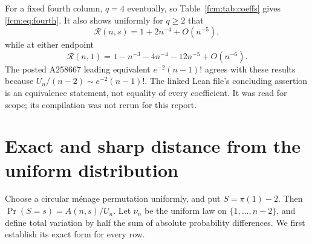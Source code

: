 \documentclass[11pt,letterpaper]{article}
\theoremstyle{remark}\newtheorem{remark}[theorem]{Remark}
\newcommand{\RR}{\mathcal R}
\begin{document}
For a fixed fourth column, $q=4$ eventually, so Table~\ref{fcm:tab:coeffs} gives \eqref{fcm:eq:fourth}. It also shows uniformly for $q\ge2$ that
\begin{equation}\label{fcm:eq:interior-leading}
 \RR(n,s)=1+2n^{-4}+O(n^{-5}),
\end{equation}
while at either endpoint
\begin{equation}\label{fcm:eq:endpoint}
 \RR(n,1)=1-n^{-3}-4n^{-4}-12n^{-5}+O(n^{-6}).
\end{equation}
The posted A258667 leading equivalent $e^{-2}(n-1)!$ agrees with these results because $U_n/(n-2)\sim e^{-2}(n-1)!$. The linked Lean file's concluding assertion is an equivalence statement, not equality of every coefficient. It was read for scope; its compilation was not rerun for this report.

\section{Exact and sharp distance from the uniform distribution}
Choose a circular m\'enage permutation uniformly, and put $S=\pi(1)-2$. Then $\Pr(S=s)=A(n,s)/U_n$. Let $\nu_n$ be the uniform law on $\{1,\ldots,n-2\}$, and define total variation by half the sum of absolute probability differences. We first establish its exact form for every row.
\end{document}
